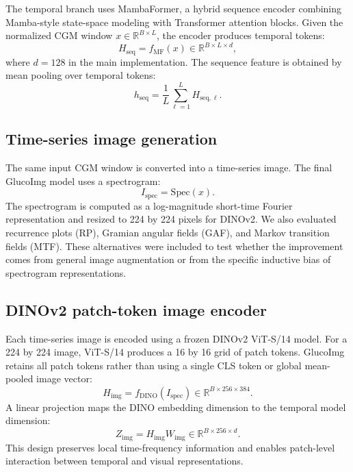 \documentclass[11pt]{article}
\begin{document}
The temporal branch uses MambaFormer, a hybrid sequence encoder combining Mamba-style state-space modeling with Transformer attention blocks. Given the normalized CGM window \(x \in \mathbb{R}^{B \times L}\), the encoder produces temporal tokens:
\begin{equation}
H_{\mathrm{seq}} = f_{\mathrm{MF}}(x) \in \mathbb{R}^{B \times L \times d},
\end{equation}
where \(d=128\) in the main implementation. The sequence feature is obtained by mean pooling over temporal tokens:
\begin{equation}
h_{\mathrm{seq}} = \frac{1}{L}\sum_{\ell=1}^{L} H_{\mathrm{seq},\ell}.
\end{equation}

\subsection{Time-series image generation}

The same input CGM window is converted into a time-series image. The final GlucoImg model uses a spectrogram:
\begin{equation}
I_{\mathrm{spec}} = \mathrm{Spec}(x).
\end{equation}
The spectrogram is computed as a log-magnitude short-time Fourier representation and resized to 224 by 224 pixels for DINOv2. We also evaluated recurrence plots (RP), Gramian angular fields (GAF), and Markov transition fields (MTF). These alternatives were included to test whether the improvement comes from general image augmentation or from the specific inductive bias of spectrogram representations.

\subsection{DINOv2 patch-token image encoder}

Each time-series image is encoded using a frozen DINOv2 ViT-S/14 model. For a 224 by 224 image, ViT-S/14 produces a 16 by 16 grid of patch tokens. GlucoImg retains all patch tokens rather than using a single CLS token or global mean-pooled image vector:
\begin{equation}
H_{\mathrm{img}} = f_{\mathrm{DINO}}(I_{\mathrm{spec}}) \in \mathbb{R}^{B \times 256 \times 384}.
\end{equation}
A linear projection maps the DINO embedding dimension to the temporal model dimension:
\begin{equation}
Z_{\mathrm{img}} = H_{\mathrm{img}} W_{\mathrm{img}} \in \mathbb{R}^{B \times 256 \times d}.
\end{equation}
This design preserves local time-frequency information and enables patch-level interaction between temporal and visual representations.
\end{document}
